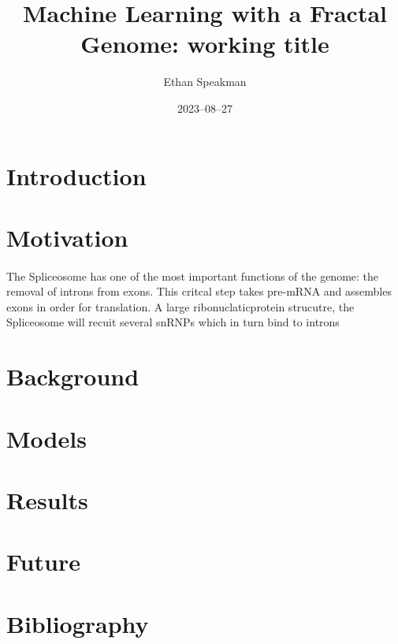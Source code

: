 \documentclass[12pt]{article}
\title{Machine Learning with a Fractal Genome: working title}
\author{Ethan Speakman}
\date{2023–08–27}
\begin{document}
\maketitle

\section{Introduction}

\section{Motivation}
\paragraph*{}
The Spliceosome has one of the most important functions of the genome: the removal of introns from exons. This critcal step takes pre-mRNA and assembles exons in order for translation. A large ribonuclaticprotein strucutre, the Spliceosome will recuit several snRNPs which in turn bind to introns  
\paragraph*{}

\section{Background}

\section{Models}

\section{Results}

\section{Future}

\section{Bibliography}
\end{document}
